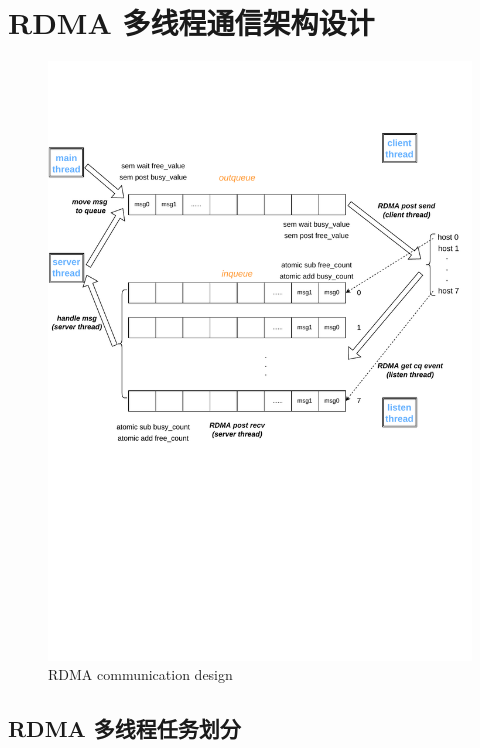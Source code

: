 {%



\section{RDMA 多线程通信架构设计}

\begin{figure}[H]
    \centering
    \includegraphics[width=1.1\textwidth]{Img/RDMA_design.pdf}
    \caption{RDMA communication design}
\end{figure}


\subsection{RDMA 多线程任务划分}

}
